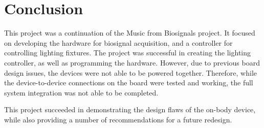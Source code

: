 \chapter{Conclusion}
This project was a continuation of the Music from Biosignals project.
It focused on developing the hardware for biosignal acquisition, and a controller for controlling lighting fixtures.
The project was successful in creating the lighting controller, as well as programming the hardware.
However, due to previous board design issues, the devices were not able to be powered together.
Therefore, while the device-to-device connections on the board were tested and working,
the full system integration was not able to be completed.

This project succeeded in demonstrating the design flaws of the on-body device, while also providing a number of recommendations for a future redesign.
